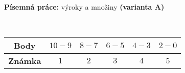 \begin{center}
\large \textbf{Písemná práce:} výroky a množiny \textbf{(varianta A)}

\normalsize
{}\qquad
{}\qquad
{}
\end{center}
\begin{table}[h]
\centering

\\
\begin{tabular}{c|c|c|c|c|c}
    \textbf{Body}   & $10-9$ & $8-7$ & $6-5$ & $4-3$ & $2-0$ \\ \hline
    \textbf{Známka} & $1$     & $2$   & $3 $  & $4$   & $5$
\end{tabular}
\end{table}

\printanswers


